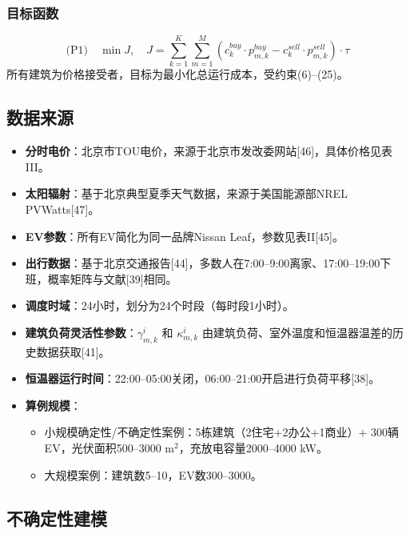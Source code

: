 \documentclass[11pt]{ctexart}
\begin{document}
\subsubsection{目标函数}
\begin{equation}
    \text{(P1)} \quad \min J, \quad J = \sum_{k=1}^{K} \sum_{m=1}^{M} (c_k^{buy} \cdot p_{m,k}^{buy} - c_k^{sell} \cdot p_{m,k}^{sell}) \cdot \tau
\end{equation}
所有建筑为价格接受者，目标为最小化总运行成本，受约束(6)--(25)。

\subsection{数据来源}

\begin{itemize}[leftmargin=2em]
    \item \textbf{分时电价}：北京市TOU电价，来源于北京市发改委网站[46]，具体价格见表III。
    \item \textbf{太阳辐射}：基于北京典型夏季天气数据，来源于美国能源部NREL PVWatts[47]。
    \item \textbf{EV参数}：所有EV简化为同一品牌Nissan Leaf，参数见表II[45]。
    \item \textbf{出行数据}：基于北京交通报告[44]，多数人在7:00--9:00离家、17:00--19:00下班，概率矩阵与文献[39]相同。
    \item \textbf{调度时域}：24小时，划分为24个时段（每时段1小时）。
    \item \textbf{建筑负荷灵活性参数}：$\gamma_{m,k}^i$ 和 $\kappa_{m,k}^i$ 由建筑负荷、室外温度和恒温器温差的历史数据获取[41]。
    \item \textbf{恒温器运行时间}：22:00--05:00关闭，06:00--21:00开启进行负荷平移[38]。
    \item \textbf{算例规模}：
    \begin{itemize}
        \item 小规模确定性/不确定性案例：5栋建筑（2住宅+2办公+1商业）+ 300辆EV，光伏面积500--3000 m$^2$，充放电容量2000--4000 kW。
        \item 大规模案例：建筑数5--10，EV数300--3000。
    \end{itemize}
\end{itemize}

\subsection{不确定性建模}
\end{document}
